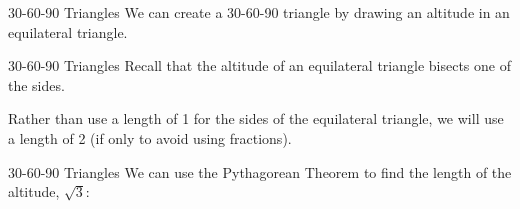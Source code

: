 \documentclass[t]{beamer}
\begin{document}
\begin{frame}{30-60-90 Triangles}
    We can create a 30-60-90 triangle by drawing an altitude in an equilateral triangle.

\begin{center}
\end{center}
\end{frame}

\begin{frame}{30-60-90 Triangles}
Recall that the altitude of an equilateral triangle bisects one of the sides.   \newline\\    \pause

Rather than use a length of 1 for the sides of the equilateral triangle, we will use a length of 2 (if only to avoid using fractions). \newline\\ \pause

\begin{center}
\end{center}
\end{frame}

\begin{frame}{30-60-90 Triangles}
We can use the Pythagorean Theorem to find the length of the altitude, $\sqrt{3}$:

\begin{center}
\end{center}
\end{frame}
\end{document}
